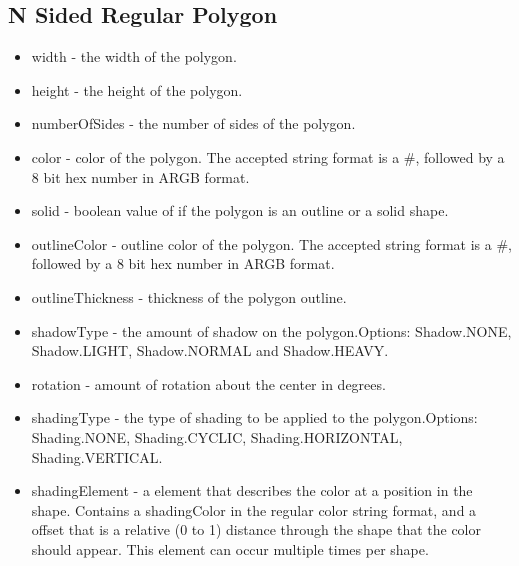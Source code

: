\documentclass{article}
\begin{document}
\subsection{N Sided Regular Polygon}
\begin{itemize}
\item width - the width of the polygon.
\item height - the height of the polygon.
\item numberOfSides - the number of sides of the polygon.
\item color - color of the polygon. The accepted string format is a \#, followed by a 8 bit hex number in ARGB format.
\item solid - boolean value of if the polygon is an outline or a solid shape.
\item outlineColor - outline color of the polygon. The accepted string format is a \#, followed by a 8 bit hex number in ARGB format.
\item outlineThickness - thickness of the polygon outline.
\item shadowType - the amount of shadow on the polygon.\newline  Options: Shadow.NONE, Shadow.LIGHT, Shadow.NORMAL and Shadow.HEAVY.
\item rotation - amount of rotation about the center in degrees. 
\item shadingType - the type of shading to be applied to the polygon.\newline  Options: Shading.NONE, Shading.CYCLIC, Shading.HORIZONTAL, Shading.VERTICAL.
\item shadingElement - a element that describes the color at a position in the shape. Contains a shadingColor in the regular color string format, and a offset that is a relative (0 to 1) distance through the shape that the color should appear. This element can occur multiple times per shape.
\end{itemize}
\end{document}
